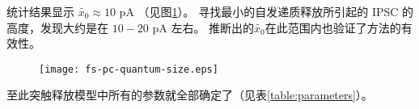 统计结果显示 $\tilde{x_0} \approx 10$ pA （见图\ref{figure:fs-pc-quantum-size}）。
寻找最小的自发递质释放所引起的 IPSC 的高度，发现大约是在 $10 - 20$ pA 左右。
推断出的$\tilde{x_0}$在此范围内也验证了方法的有效性。

\begin{figure}
\centering
\texttt{[image: fs-pc-quantum-size.eps]}
\caption{}
\label{figure:fs-pc-quantum-size}
\end{figure}

至此突触释放模型中所有的参数就全部确定了（见表\ref{table:parameters}）。